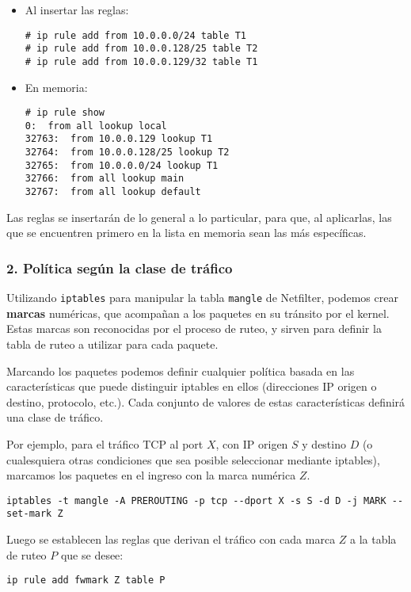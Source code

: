 \begin{itemize}
	\item Al insertar las reglas: 
\begin{lstlisting}
# ip rule add from 10.0.0.0/24 table T1
# ip rule add from 10.0.0.128/25 table T2
# ip rule add from 10.0.0.129/32 table T1
\end{lstlisting}
	\item En memoria:
	\begin{lstlisting}
# ip rule show
0:	from all lookup local 
32763:	from 10.0.0.129 lookup T1
32764:	from 10.0.0.128/25 lookup T2 
32765:	from 10.0.0.0/24 lookup T1 
32766:	from all lookup main 
32767:	from all lookup default 
\end{lstlisting}
\end{itemize}

Las reglas se insertarán de lo general a lo particular, para que, al aplicarlas, las que se encuentren primero en la lista en memoria sean las más específicas. 
 
\subsubsection{2. Política según la clase de tráfico}

Utilizando \texttt{iptables} para manipular la tabla \texttt{mangle} de Netfilter, podemos crear \textbf{marcas} numéricas, que acompañan a los paquetes en su tránsito por el kernel. Estas marcas son reconocidas por el proceso de ruteo, y sirven para definir la tabla de ruteo a utilizar para cada paquete.

Marcando los paquetes podemos definir cualquier política basada en las características que puede distinguir iptables en ellos (direcciones IP origen o destino, protocolo, etc.). Cada conjunto de valores de estas características definirá una clase de tráfico.

Por ejemplo, para el tráfico TCP al port $X$, con IP origen $S$ y destino $D$ (o cualesquiera otras condiciones que sea posible seleccionar mediante iptables), marcamos los paquetes en el ingreso con la marca numérica $Z$.
\begin{lstlisting}
iptables -t mangle -A PREROUTING -p tcp --dport X -s S -d D -j MARK --set-mark Z
\end{lstlisting}

Luego se establecen las reglas que derivan el tráfico con cada marca $Z$ a la tabla de ruteo $P$ que se desee:
\begin{lstlisting}
ip rule add fwmark Z table P
\end{lstlisting}

